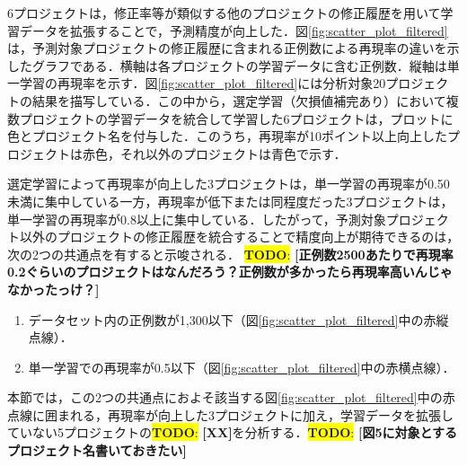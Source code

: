 \documentclass[submit]{ipsj}
\newcommand{\todo}[1]{\colorbox{yellow}{{\bf TODO}:}{\color{red} {\textbf{[#1]}}}}
\begin{document}

6プロジェクトは，修正率等が類似する他のプロジェクトの修正履歴を用いて学習データを拡張することで，予測精度が向上した．図\ref{fig:scatter_plot_filtered}は，予測対象プロジェクトの修正履歴に含まれる正例数による再現率の違いを示したグラフである．横軸は各プロジェクトの学習データに含む正例数．縦軸は単一学習の再現率を示す．図\ref{fig:scatter_plot_filtered}には分析対象20プロジェクトの結果を描写している．この中から，選定学習（欠損値補完あり）において複数プロジェクトの学習データを統合して学習した6プロジェクトは，プロットに色とプロジェクト名を付与した．このうち，再現率が10ポイント以上向上したプロジェクトは赤色，それ以外のプロジェクトは青色で示す．


選定学習によって再現率が向上した3プロジェクトは，単一学習の再現率が0.50未満に集中している一方，再現率が低下または同程度だった3プロジェクトは，単一学習の再現率が0.8以上に集中している．したがって，予測対象プロジェクト以外のプロジェクトの修正履歴を統合することで精度向上が期待できるのは，次の2つの共通点を有すると示唆される．
\todo{正例数2500あたりで再現率0.2ぐらいのプロジェクトはなんだろう？正例数が多かったら再現率高いんじゃなかったっけ？}

\begin{enumerate}
    \item データセット内の正例数が1,300以下（図\ref{fig:scatter_plot_filtered}中の赤縦点線）．
    \item 単一学習での再現率が0.5以下（図\ref{fig:scatter_plot_filtered}中の赤横点線）．
\end{enumerate}

本節では，この2つの共通点におよそ該当する図\ref{fig:scatter_plot_filtered}中の赤点線に囲まれる，再現率が向上した3プロジェクトに加え，学習データを拡張していない5プロジェクトの\todo{XX}を分析する．\todo{図5に対象とするプロジェクト名書いておきたい}
\end{document}
